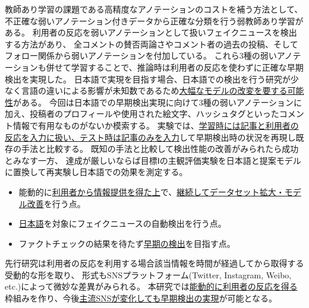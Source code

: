 教師あり学習の課題である高精度なアノテーションのコストを補う方法として、
不正確な弱いアノテーション付きデータから正確な分類を行う弱教師あり学習がある。
利用者の反応を弱いアノテーションとして扱いフェイクニュースを検出する方法があり\cite{shu2020leveraging}、
全コメントの賛否両論さやコメント者の過去の投稿、そしてフォロー関係から弱いアノテーションを付加している。
これら3種の弱いアノテーションも併せて学習することで、推論時は利用者の反応を使わずに正確な早期検出を実現した。
日本語で実現を目指す場合、日本語での検出を行う研究が少なく言語の違いによる影響が未知数であるため\underline{大幅なモデルの改変を要する可能性}がある。
今回は日本語での早期検出実現に向けて3種の弱いアノテーションに加え、投稿者のプロフィールや使用された絵文字、ハッシュタグといったコメント情報で有用なものがないか模索する。
実験では、\underline{学習時には記事と利用者の反応を入力に扱い、テスト時は記事のみを入力}して早期検出時の状況を再現し既存の手法と比較する。
既知の手法と比較して検出性能の改善がみられたら成功とみなす一方、
達成が厳しいならば目標Ⅰの主観評価実験を日本語と提案モデルに置換して再実験し日本語での効果を測定する。


\vspace{20pt}
\begin{itemize}
    \setlength{\parskip}{0cm}
    \setlength{\itemsep}{0cm}
    \item 能動的に\underline{利用者から情報提供を得た上}で、\underline{継続してデータセット拡大・モデル改善}を行う点。
    \item \underline{日本語}を対象にフェイクニュースの自動検出を行う点。
    \item ファクトチェックの結果を待たず\underline{早期の検出}を目指す点。
\end{itemize}
\vspace{-10pt}
先行研究は利用者の反応を利用する場合該当情報を時間が経過してから取得する受動的な形を取り、
形式もSNSプラットフォーム(Twitter, Instagram, Weibo, etc.)によって微妙な差異がみられる。
本研究では\underline{能動的に利用者の反応を得る}枠組みを作り、今後\underline{主流SNSが変化しても早期検出の実現}が可能となる。

